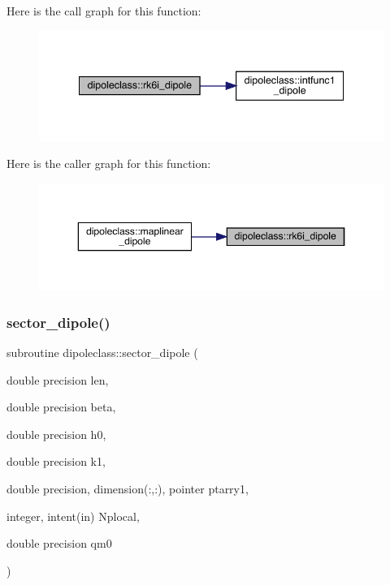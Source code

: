 Here is the call graph for this function\+:\nopagebreak
\begin{figure}[H]
\begin{center}
\leavevmode
\includegraphics[width=341pt]{namespacedipoleclass_a1a92cd51d6ad864d251dd3abdc361ba8_cgraph}
\end{center}
\end{figure}
Here is the caller graph for this function\+:\nopagebreak
\begin{figure}[H]
\begin{center}
\leavevmode
\includegraphics[width=350pt]{namespacedipoleclass_a1a92cd51d6ad864d251dd3abdc361ba8_icgraph}
\end{center}
\end{figure}
\mbox{\label{namespacedipoleclass_a2aaba3f2e21950bbcafe3eb744fff547}} 
\subsubsection{\texorpdfstring{sector\_dipole()}{sector\_dipole()}}
{\footnotesize\ttfamily subroutine dipoleclass\+::sector\+\_\+dipole (\begin{DoxyParamCaption}\item[{double precision}]{len,  }\item[{double precision}]{beta,  }\item[{double precision}]{h0,  }\item[{double precision}]{k1,  }\item[{double precision, dimension(\+:,\+:), pointer}]{ptarry1,  }\item[{integer, intent(in)}]{Nplocal,  }\item[{double precision}]{qm0 }\end{DoxyParamCaption})}

